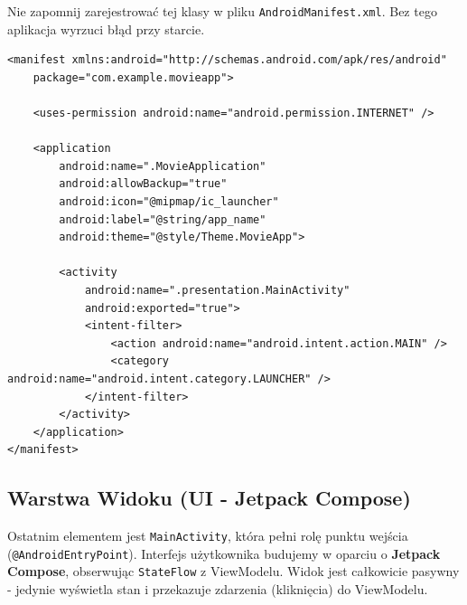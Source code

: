 Nie zapomnij zarejestrować tej klasy w pliku \texttt{AndroidManifest.xml}. Bez tego aplikacja wyrzuci błąd przy starcie.

\begin{verbatim}
<manifest xmlns:android="http://schemas.android.com/apk/res/android"
    package="com.example.movieapp">

    <uses-permission android:name="android.permission.INTERNET" />

    <application
        android:name=".MovieApplication" 
        android:allowBackup="true"
        android:icon="@mipmap/ic_launcher"
        android:label="@string/app_name"
        android:theme="@style/Theme.MovieApp">
        
        <activity
            android:name=".presentation.MainActivity"
            android:exported="true">
            <intent-filter>
                <action android:name="android.intent.action.MAIN" />
                <category android:name="android.intent.category.LAUNCHER" />
            </intent-filter>
        </activity>
    </application>
</manifest>
\end{verbatim}

\subsection{Warstwa Widoku (UI - Jetpack Compose)}

Ostatnim elementem jest \texttt{MainActivity}, która pełni rolę punktu wejścia (\texttt{@AndroidEntryPoint}). Interfejs użytkownika budujemy w oparciu o \textbf{Jetpack Compose}, obserwując \texttt{StateFlow} z ViewModelu. Widok jest całkowicie pasywny - jedynie wyświetla stan i przekazuje zdarzenia (kliknięcia) do ViewModelu.

